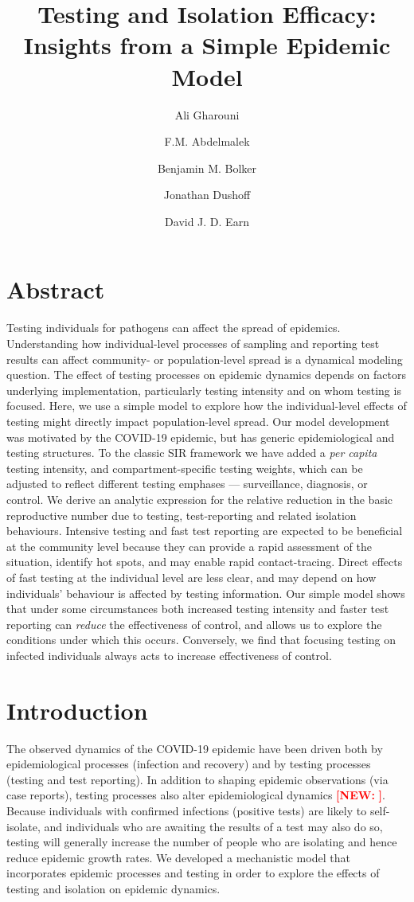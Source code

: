\documentclass[12pt]{article}
\title{Testing and Isolation Efficacy:\\Insights from a Simple Epidemic Model}
\author[1]{Ali Gharouni}
\author[1]{F.M. Abdelmalek}
\author[1,2,3]{Benjamin M. Bolker}
\author[2,4,3]{Jonathan Dushoff}
\author[1,3,5]{David J. D. Earn}
\affil[1]{Department of Mathematics \& Statistics, McMaster University, Hamilton, Canada}
\affil[2]{Department of Biology, McMaster University, Hamilton, Canada}
\affil[3]{Michael G. DeGroote Institute for Infectious Disease Research, McMaster University, Hamilton, Canada}
\affil[4]{South African Centre for Epidemiological Modelling and Analysis, University of Stellenbosch, Stellenbosch, South Africa}
\newcommand{\percap}{\emph{per capita}\xspace}
\newcommand{\covid}{COVID-19\xspace}
\DeclareRobustCommand\_{\ifmmode\expandafter\subtxt\else\textunderscore\fi}
\newcommand{\comment}{\showcomment}
\newcommand{\showcomment}[3]{\textcolor{#1}{\textbf{[#2: }\textsl{#3}\textbf{]}}}
\newcommand{\new}[1]{\comment{red}{NEW}{#1}}
\theoremstyle{definition} %
\begin{document}
\maketitle

\linenumbers

\section{Abstract}

Testing individuals for pathogens can affect the spread of epidemics. 
Understanding how individual-level processes of sampling and reporting test results can affect community- or population-level spread is a dynamical modeling question.
The effect of testing processes on epidemic dynamics depends on factors underlying implementation, particularly testing intensity and on whom testing is focused.
Here, we use a simple model to explore how the individual-level effects of testing might directly impact population-level spread.
Our model development was motivated by the \covid epidemic, but has generic epidemiological and testing structures. 
To the classic SIR framework we have added a \percap testing intensity, and compartment-specific testing weights, which can be adjusted to reflect different testing emphases --- surveillance, diagnosis, or control. 
We derive an analytic expression for the relative reduction in the basic reproductive number due to testing, test-reporting and related isolation behaviours.
Intensive testing and fast test reporting are expected to be beneficial at the community level because they can provide a rapid assessment of the situation, identify hot spots, and may enable rapid contact-tracing. 
Direct effects of fast testing at the individual level are less clear, and may depend on how individuals' behaviour is affected by testing information.
Our simple model shows that under some circumstances both increased testing intensity and faster test reporting can \emph{reduce} the effectiveness of control, and allows us to explore the conditions under which this occurs.
Conversely, we find that focusing testing on infected individuals always acts to increase effectiveness of control.

\section{Introduction}

The observed dynamics of the \covid epidemic have been driven both by epidemiological processes (infection and recovery) and by testing processes (testing and test reporting). In addition to shaping epidemic observations (via case reports), testing processes also alter epidemiological dynamics \new{\citep{peto2020covid,taipale2020population}}. Because individuals with confirmed infections (positive tests) are likely to self-isolate, and individuals who are awaiting the results of a test may also do so, testing will generally increase the number of people who are isolating and hence reduce epidemic growth rates. We developed a mechanistic model that incorporates epidemic processes and testing in order to explore the effects of testing and isolation on epidemic dynamics.
\end{document}
